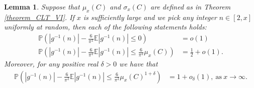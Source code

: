 \documentclass[11pt,reqno,a4letter]{article}
\numberwithin{figure}{section}
\numberwithin{table}{section}
\theoremstyle{plain}
\newtheorem{lemma}[theorem]{Lemma}
\numberwithin{theorem}{section}
\theoremstyle{definition}
\begin{document}
\begin{lemma} 
\label{lemma_ProbsOfAbsgInvnDist_v2} 
Suppose that $\mu_x(C)$ and $\sigma_x(C)$ are defined as in 
Theorem \ref{theorem_CLT_VI}. 
If $x$ is sufficiently large and we pick any integer $n \in [2, x]$ uniformly at random, then 
each of the following statements holds: 
\begin{align*} 
\tag{A}
\mathbb{P}\left(|g^{-1}(n)| - \frac{6}{\pi^2} \mathbb{E}|g^{-1}(n)| \leq 0\right) & = o(1) \\ 
\tag{B} 
\mathbb{P}\left(|g^{-1}(n)| - \frac{6}{\pi^2} \mathbb{E}|g^{-1}(n)| \leq \frac{6}{\pi^2} \mu_x(C)\right) & = 
     \frac{1}{2} + o(1). 
\end{align*} 
Moreover, for any positive real $\delta > 0$ we have that 
\begin{align*} 
\tag{C} 
\mathbb{P}\left(|g^{-1}(n)| - \frac{6}{\pi^2} \mathbb{E}|g^{-1}(n)| \leq \frac{6}{\pi^2} \mu_x(C)^{1 + \delta}\right) & = 
     1 + o_{\delta}(1), 
     \mathrm{\ as\ } x \rightarrow \infty. 
\end{align*} 
\end{lemma} 
\end{document}
